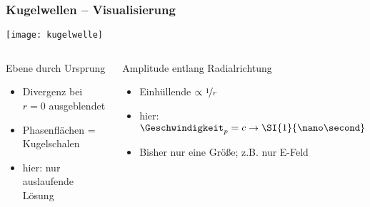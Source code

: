 \begin{frame}
  \frametitle{Kugelwellen -- Visualisierung}
  \centering\texttt{[image: kugelwelle]}
  \begin{columns}
    \begin{column}{0.5\textwidth}
      \centerline{Ebene durch Ursprung}
      \begin{itemize}
      \item Divergenz bei \(r=0\) ausgeblendet
      \item Phasenflächen = Kugelschalen
        \item hier: nur auslaufende Lösung
        \end{itemize}
    \end{column}
    \begin{column}{0.5\textwidth}
      \centerline{Amplitude entlang Radialrichtung}
      \begin{itemize}
      \item Einhüllende \(\propto \nicefrac{1}{r}\)
        \item hier: \(\Geschwindigkeit_p = c \to \SI{1}{\nano\second} \simeq \SI{33}{\centi\meter}\)
      \item Bisher nur eine Größe; z.B. nur E-Feld 
        \end{itemize}
      \end{column}
    \end{columns}
  \end{frame}
    
